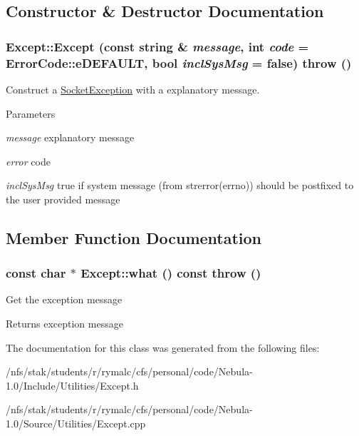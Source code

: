 \subsection{Constructor \& Destructor Documentation}
\hypertarget{classExcept_a11d3d6f909f2f86f2293f1c6353f2da0}{
\subsubsection[{Except}]{\setlength{\rightskip}{0pt plus 5cm}Except::Except (const string \& {\em message}, \/  int {\em code} = {\ttfamily ErrorCode::eDEFAULT}, \/  bool {\em inclSysMsg} = {\ttfamily false})  throw ()}}
\label{classExcept_a11d3d6f909f2f86f2293f1c6353f2da0}
Construct a \hyperlink{classSocketException}{SocketException} with a explanatory message. 
\begin{DoxyParams}{Parameters}
\item[{\em message}]explanatory message \item[{\em error}]code \item[{\em inclSysMsg}]true if system message (from strerror(errno)) should be postfixed to the user provided message \end{DoxyParams}


\subsection{Member Function Documentation}
\hypertarget{classExcept_a33a7e9f297703a8f427046004bf1260b}{
\subsubsection[{what}]{\setlength{\rightskip}{0pt plus 5cm}const char $\ast$ Except::what () const  throw ()}}
\label{classExcept_a33a7e9f297703a8f427046004bf1260b}
Get the exception message \begin{DoxyReturn}{Returns}
exception message 
\end{DoxyReturn}


The documentation for this class was generated from the following files:\begin{DoxyCompactItemize}
\item 
/nfs/stak/students/r/rymalc/cfs/personal/code/Nebula-\/1.0/Include/Utilities/Except.h\item 
/nfs/stak/students/r/rymalc/cfs/personal/code/Nebula-\/1.0/Source/Utilities/Except.cpp\end{DoxyCompactItemize}
